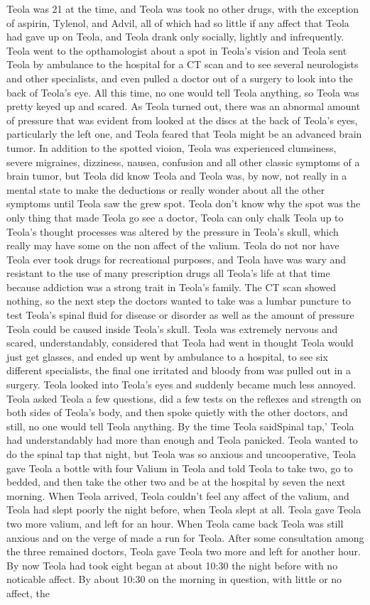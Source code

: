 \documentclass[12pt]{book}
\begin{document}
Teola was 21 at the time, and Teola was took no other drugs, with the exception of aspirin, Tylenol, and Advil, all of which had so little if any affect that Teola had gave up on Teola, and Teola drank only socially, lightly and infrequently. Teola went to the opthamologist about a spot in Teola's vision and Teola sent Teola by ambulance to the hospital for a CT scan and to see several neurologists and other specialists, and even pulled a doctor out of a surgery to look into the back of Teola's eye. All this time, no one would tell Teola anything, so Teola was pretty keyed up and scared. As Teola turned out, there was an abnormal amount of pressure that was evident from looked at the discs at the back of Teola's eyes, particularly the left one, and Teola feared that Teola might be an advanced brain tumor. In addition to the spotted vioion, Teola was experienced clumsiness, severe migraines, dizziness, nausea, confusion and all other classic symptoms of a brain tumor, but Teola did know Teola and Teola was, by now, not really in a mental state to make the deductions or really wonder about all the other symptoms until Teola saw the grew spot. Teola don't know why the spot was the only thing that made Teola go see a doctor, Teola can only chalk Teola up to Teola's thought processes was altered by the pressure in Teola's skull, which really may have some  on the non affect of the valium. Teola do not nor have Teola ever took drugs for recreational purposes, and Teola have was wary and resistant to the use of many prescription drugs all Teola's life at that time because addiction was a strong trait in Teola's family. The CT scan showed nothing, so the next step the doctors wanted to take was a lumbar puncture to test Teola's spinal fluid for disease or disorder as well as the amount of pressure Teola could be caused inside Teola's skull. Teola was extremely nervous and scared, understandably, considered that Teola had went in thought Teola would just get glasses, and ended up went by ambulance to a hospital, to see six different specialists, the final one irritated and bloody from was pulled out in a surgery. Teola looked into Teola's eyes and suddenly became much less annoyed. Teola asked Teola a few questions, did a few tests on the reflexes and strength on both sides of Teola's body, and then spoke quietly with the other doctors, and still, no one would tell Teola anything. By the time Teola saidSpinal tap,' Teola had understandably had more than enough and Teola panicked. Teola wanted to do the spinal tap that night, but Teola was so anxious and uncooperative, Teola gave Teola a bottle with four Valium in Teola and told Teola to take two, go to bedded, and then take the other two and be at the hospital by seven the next morning. When Teola arrived, Teola couldn't feel any affect of the valium, and Teola had slept poorly the night before, when Teola slept at all. Teola gave Teola two more valium, and left for an hour. When Teola came back Teola was still anxious and on the verge of made a run for Teola. After some consultation among the three remained doctors, Teola gave Teola two more and left for another hour. By now Teola had took eight began at about 10:30 the night before with no noticable affect. By about 10:30 on the morning in question, with little or no affect, the 
\end{document}
